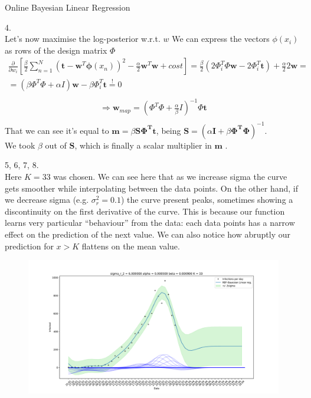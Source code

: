 \documentclass[english]{exercisesheet}
\begin{document}
\begin{nexercise}{Online Bayesian Linear Regression}
\begin{solution}
      \end{solution}
      \par
      \begin{solution} 4.\\
      Let's now maximise the log-posterior w.r.t. $w$
      We can express the vectors $\phi(x_{i})$ as rows of the design matrix $\Phi$
      \begin{align*}
          \frac{\partial}{\partial w_{i}}\left[\frac{\beta}{2}\sum_{n=1}^{N}(\bm{t}-\bm{w}^{T}\bm{\phi}(x_{n}))^{2}-\frac{\alpha}{2}\bm{w}^{T}\bm{w}+cost \right] = \frac{\beta}{2}(2\Phi_{i}^{T}\Phi \bm{w} - 2\Phi_{i}^{T}\bm{t}) + \frac{\alpha}{2}2\bm{w} = \\ = \left(\beta\Phi^{T}\Phi+\alpha I\right)\bm{w}-\beta\Phi_{i}^{T}\bm{t} \stackrel{!}{=} 0 \\
      \end{align*}
      \begin{align*}
          \Rightarrow \bm{w}_{map} = (\Phi^{T}\Phi + \frac{\alpha}{\beta}I)^{-1}\Phi \bm{t} \\
      \end{align*}
      That we can see it's equal to $\bm{m} = \beta\bm{S\Phi^{T}t}$, being $\bm{S}=\left(\alpha \bm{I} +\beta \bm{\Phi^{T}\Phi}\right)^{-1}$.\\ We took $\beta$ out of $\bm{S}$, which is finally a scalar multiplier in $\bm{m}$ .\\
      \end{solution}
      \par
      \begin{solution} 5, 6, 7, 8.\\
            Here $K = 33$ was chosen.
              We can see here that as we increase sigma the curve gets smoother while interpolating between the data points. On the other hand, if we decrease sigma (e.g. $\sigma_{r}^{2} = 0.1$) the curve present peaks, sometimes showing a discontinuity on the first derivative of the curve. This is because our function learns very particular “behaviour” from the data: each data points has a narrow effect on the prediction of the next value.
            We can also notice how abruptly our prediction for $x > K$ flattens on the mean value.
        \begin{figure}
        \centering
        \includegraphics[width=1\textwidth]{1.pdf}

\end{figure}
\end{solution}
\end{nexercise}
\end{document}
